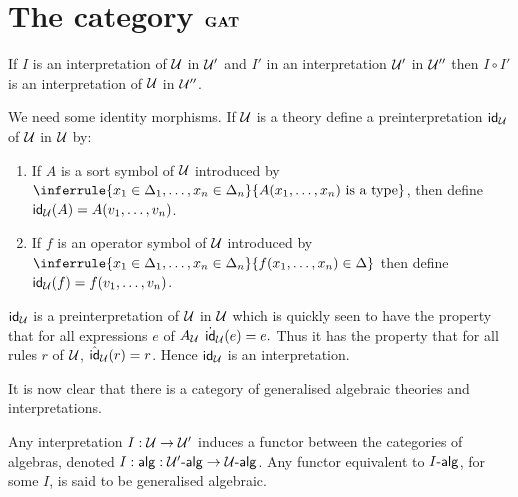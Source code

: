   \lipsum[12]

  \section{The category $\mathbf{GAT}$} \label{sec:source-1-14}

  \lipsum[13]

  \begin{corollary}[5]
    If $I$ is an interpretation of $\mathcal{U}$ in $\mathcal{U}'$ and $I'$ in an interpretation $\mathcal{U}'$ in $\mathcal{U}''$ then $I\circ I'$ is an interpretation of $\mathcal{U}$ in $\mathcal{U}''$.
  \end{corollary}

  We need some identity morphisms.
  If $\mathcal{U}$ is a theory define a preinterpretation $\mathsf{id}_{\mathcal{U}}$ of $\mathcal{U}$ in $\mathcal{U}$ by:
  \begin{enumerate}
    \item If $A$ is a sort symbol of $\mathcal{U}$ introduced by $\inferrule{x_1\in\Delta_1,\ldots,x_n\in\Delta_n}{A(x_1,\ldots,x_n)\isatype}$, then define $\mathsf{id}_{\mathcal{U}}(A)=A(v_1,\ldots,v_n)$.
    \item If $f$ is an operator symbol of $\mathcal{U}$ introduced by $\inferrule{x_1\in\Delta_1,\ldots,x_n\in\Delta_n}{f(x_1,\ldots,x_n)\in\Delta}$ then define $\mathsf{id}_{\mathcal{U}}(f)=f(v_1,\ldots,v_n)$.
  \end{enumerate}

  $\mathsf{id}_{\mathcal{U}}$ is a preinterpretation of $\mathcal{U}$ in $\mathcal{U}$ which is quickly seen to have the property that for all expressions $e$ of $A_{\mathcal{U}}$ $\dot {\mathsf{id}}_{\mathcal{U}}(e)=e.$
  Thus it has the property that for all rules $r$ of $\mathcal{U}$, $\hat{\mathsf{id}}_{\mathcal{U}}(r)=r$.
  Hence $\mathsf{id}_{\mathcal{U}}$ is an interpretation.

  It is now clear that there is a category of generalised algebraic theories and interpretations.

  Any interpretation $I:\mathcal{U}\to\mathcal{U}'$ induces a functor between the categories of algebras, denoted $I:\mathsf{alg}: \mathcal{U}'\text{-}\mathsf{alg}\to\mathcal{U}\text{-}\mathsf{alg}$.
  Any functor equivalent to $I\text{-}\mathsf{alg}$, for some $I$, is said to be generalised algebraic.

